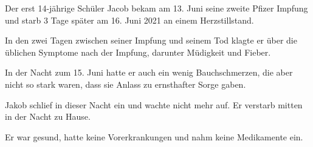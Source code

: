 Der erst 14-jährige Schüler Jacob bekam am 13. Juni seine zweite Pfizer Impfung
und starb 3 Tage später am 16. Juni 2021 an einem Herzstillstand.

In den zwei Tagen zwischen seiner Impfung und seinem Tod klagte er über die
üblichen Symptome nach der Impfung, darunter Müdigkeit und Fieber.

In der Nacht zum 15. Juni hatte er auch ein wenig Bauchschmerzen, die aber nicht
so stark waren, dass sie Anlass zu ernsthafter Sorge gaben.

Jakob schlief in dieser Nacht ein und wachte nicht mehr auf. Er verstarb mitten
in der Nacht zu Hause.

Er war gesund, hatte keine Vorerkrankungen und nahm keine Medikamente ein.
